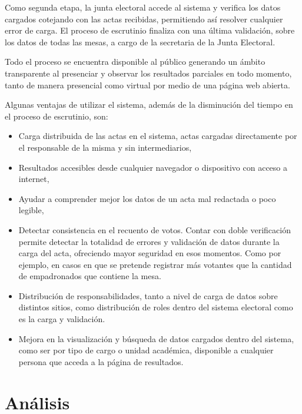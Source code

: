 Como segunda etapa, la junta electoral accede al sistema y verifica los datos cargados cotejando con las actas recibidas, permitiendo así resolver cualquier error de carga. 
El proceso de escrutinio finaliza con una última validación, sobre los datos de todas las mesas, a cargo de la secretaria de la Junta Electoral. 

Todo el proceso se encuentra disponible al público generando un ámbito transparente al presenciar y observar los resultados parciales en todo momento, tanto de manera presencial como virtual por medio de una página web abierta.

Algunas ventajas de utilizar el sistema, además de la disminución del tiempo en el proceso de escrutinio, son:
\begin{itemize}
\item Carga distribuida de las actas en el sistema, actas cargadas directamente por el responsable de la misma y sin intermediarios,
\item Resultados accesibles desde cualquier navegador o dispositivo con acceso a internet,
\item Ayudar a comprender mejor los datos de un acta mal redactada o poco legible,
\item Detectar consistencia en el recuento de votos. Contar con doble verificación permite detectar la totalidad de errores y validación de datos durante la carga del acta, ofreciendo mayor seguridad en esos momentos. Como por ejemplo, en casos en que se pretende registrar más votantes que la cantidad de empadronados que contiene la mesa.
\item Distribución de responsabilidades, tanto a nivel de carga de datos sobre distintos sitios, como distribución de roles dentro del sistema electoral como es la carga y validación.
\item Mejora en la visualización y búsqueda de datos cargados dentro del sistema, como ser por tipo de cargo o unidad académica, disponible a cualquier persona que acceda a la página de resultados.

\end{itemize}

\section{Análisis}
